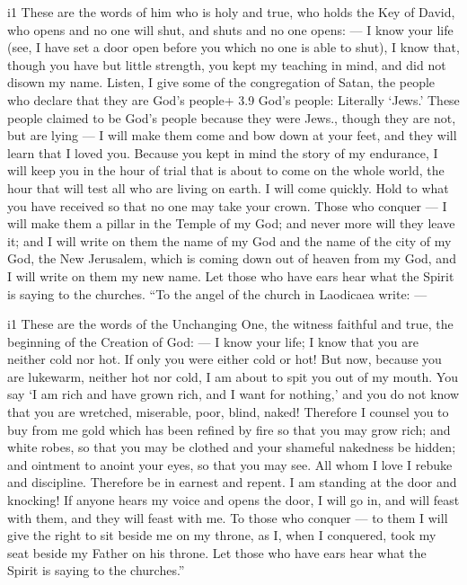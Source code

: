 i1 These are the words of him who is holy and true, who holds the Key of
David, who opens and no one will shut, and shuts and no one opens: ---
 I know your life (see, I have set a door open before you
which no one is able to shut), I know that, though you have but little
strength, you kept my teaching in mind, and did not disown my name.
 Listen, I give some of the congregation of Satan, the
people who declare that they are God's people+ 3.9 God's people:
Literally `Jews.' These people claimed to be God's people because they
were Jews., though they are not, but are lying --- I will make them come
and bow down at your feet, and they will learn that I loved you.
 Because you kept in mind the story of my endurance, I will
keep you in the hour of trial that is about to come on the whole world,
the hour that will test all who are living on earth.  I
will come quickly. Hold to what you have received so that no one may
take your crown.  Those who conquer --- I will make them a
pillar in the Temple of my God; and never more will they leave it; and I
will write on them the name of my God and the name of the city of my
God, the New Jerusalem, which is coming down out of heaven from my God,
and I will write on them my new name.  Let those who have
ears hear what the Spirit is saying to the churches.  ``To
the angel of the church in Laodicaea write: ---

i1 These are the words of the Unchanging One, the witness faithful and
true, the beginning of the Creation of God: ---  I know
your life; I know that you are neither cold nor hot. If only you were
either cold or hot!  But now, because you are lukewarm,
neither hot nor cold, I am about to spit you out of my mouth.
 You say `I am rich and have grown rich, and I want for
nothing,' and you do not know that you are wretched, miserable, poor,
blind, naked!  Therefore I counsel you to buy from me gold
which has been refined by fire so that you may grow rich; and white
robes, so that you may be clothed and your shameful nakedness be hidden;
and ointment to anoint your eyes, so that you may see.  All
whom I love I rebuke and discipline. Therefore be in earnest and repent.
 I am standing at the door and knocking! If anyone hears my
voice and opens the door, I will go in, and will feast with them, and
they will feast with me.  To those who conquer --- to them
I will give the right to sit beside me on my throne, as I, when I
conquered, took my seat beside my Father on his throne. 
Let those who have ears hear what the Spirit is saying to the
churches.''

